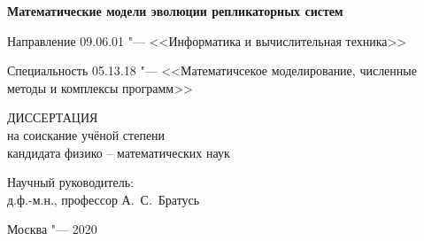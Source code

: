 \begin{center}
\textbf {\large %
Математические модели эволюции репликаторных систем}

\vspace{0pt plus2fill} %
{%
Направление 09.06.01 "---
<<Информатика и вычислительная техника>>
}

{%
Специальность 05.13.18 "---
<<Математичсекое моделирование, численные методы и комплексы программ>>
}

\vspace{0pt plus2fill} %
{\large ДИССЕРТАЦИЯ}\\
на соискание учёной степени \\
кандидата физико -- математических наук
\end{center}
%
\vspace{0pt plus4fill} %
\begin{flushright}
Научный руководитель:\\
д.ф.-м.н., профессор А.~С.~Братусь
\end{flushright}
%
\vspace{0pt plus4fill} %
\begin{center}
Москва "--- 2020
\end{center}